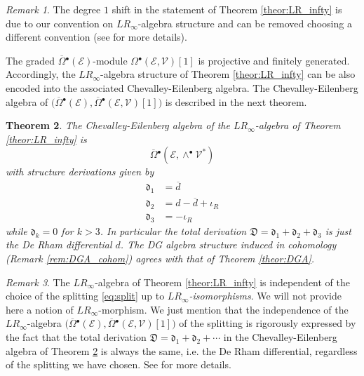 \documentclass{conm-p-l}
\newtheorem{theorem}{Theorem}[section]
\theoremstyle{definition}
\theoremstyle{remark}
\newtheorem{remark}[theorem]{Remark}
\numberwithin{equation}{section}
\begin{document}
\begin{remark}
The degree $1$ shift in the statement of Theorem \ref{theor:LR_infty} is due to our convention on $LR_\infty$-algebra structure and can be removed choosing a different convention (see \cite{vi12} for more details). 
\end{remark}

The graded $\overline \Omega{}^\bullet (\mathscr E)$-module $\Omega{}^\bullet(\mathscr E, \mathscr V)[1]$ is projective and finitely generated. Accordingly, the $LR_\infty$-algebra structure of Theorem \ref{theor:LR_infty} can be also encoded into the associated Chevalley-Eilenberg algebra. The Chevalley-Eilenberg algebra of $\big(\overline \Omega{}^\bullet (\mathscr E), \overline \Omega{}^\bullet(\mathscr E, \mathscr V)[1]\big)$ is described in the next theorem.

\begin{theorem}\label{theor:CE}
The Chevalley-Eilenberg algebra of the $LR_\infty$-algebra of Theorem \ref{theor:LR_infty} is
\[
\overline \Omega{}^\bullet (\mathscr E, \wedge^\bullet \mathscr V^\ast)
\]
with structure derivations given by
\[
\begin{aligned}
\mathfrak d_1 & = \overline d\\
\mathfrak d_2 & = d- \overline d + \iota_R \\
\mathfrak d_3 & = - \iota_R
\end{aligned}
\]
while $\mathfrak d_k = 0$ for $k > 3$. In particular the total derivation $\mathfrak D = \mathfrak d_1 + \mathfrak d_2 + \mathfrak d_3$ is just the De Rham differential $d$. The DG algebra structure induced in cohomology (Remark \ref{rem:DGA_cohom}) agrees with that of Theorem \ref{theor:DGA}.
\end{theorem}

\begin{remark}
The $LR_\infty$-algebra of Theorem \ref{theor:LR_infty} is independent of the choice of the splitting \ref{eq:split} up to \emph{$LR_\infty$-isomorphisms}. We will not provide here a notion of $LR_\infty$-morphism. We just mention that the independence of the $LR_\infty$-algebra $\big(\overline \Omega{}^\bullet (\mathscr E), \overline \Omega{}^\bullet(\mathscr E, \mathscr V)[1]\big)$ of the splitting is rigorously expressed by the fact that the total derivation $\mathfrak D = \mathfrak d_1 + \mathfrak d_2 + \cdots$ in the Chevalley-Eilenberg algebra of Theorem \ref{theor:CE} is always the same, i.e.{} the De Rham differential, regardless of the splitting we have chosen. See \cite{vi12} for more details.
\end{remark}
\end{document}
